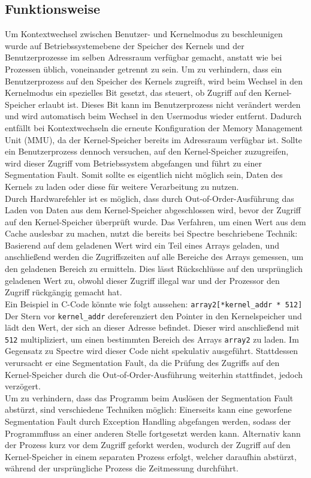 \subsection{Funktionsweise}
\label{subsec:meltdown_funktionsweise}
Um Kontextwechsel zwischen Benutzer- und Kernelmodus zu beschleunigen wurde auf Betriebssystemebene der Speicher des Kernels und der Benutzerprozesse im selben Adressraum verfügbar gemacht, anstatt wie bei Prozessen üblich, voneinander getrennt zu sein.
Um zu verhindern, dass ein Benutzerprozess auf den Speicher des Kernels zugreift, wird beim Wechsel in den Kernelmodus ein spezielles Bit gesetzt, das steuert, ob Zugriff auf den Kernel-Speicher erlaubt ist.
Dieses Bit kann im Benutzerprozess nicht verändert werden und wird automatisch beim Wechsel in den Usermodus wieder entfernt.
Dadurch entfällt bei Kontextwechseln die erneute Konfiguration der Memory Management Unit (MMU), da der Kernel-Speicher bereits im Adressraum verfügbar ist.
Sollte ein Benutzerprozess dennoch versuchen, auf den Kernel-Speicher zuzugreifen, wird dieser Zugriff vom Betriebssystem abgefangen und führt zu einer Segmentation Fault.
Somit sollte es eigentlich nicht möglich sein, Daten des Kernels zu laden oder diese für weitere Verarbeitung zu nutzen. \\
Durch Hardwarefehler ist es möglich, dass durch Out-of-Order-Ausführung das Laden von Daten aus dem Kernel-Speicher abgeschlossen wird, bevor der Zugriff auf den Kernel-Speicher überprüft wurde.
Das Verfahren, um einen Wert aus dem Cache auslesbar zu machen, nutzt die bereits bei Spectre beschriebene Technik: Basierend auf dem geladenen Wert wird ein Teil eines Arrays geladen, und anschließend werden die Zugriffszeiten auf alle Bereiche des Arrays gemessen, um den geladenen Bereich zu ermitteln.
Dies lässt Rückschlüsse auf den ursprünglich geladenen Wert zu, obwohl dieser Zugriff illegal war und der Prozessor den Zugriff rückgängig gemacht hat. \\
Ein Beispiel in C-Code könnte wie folgt aussehen:
\texttt{array2[*kernel\_addr * 512]}\\
Der Stern vor \texttt{kernel\_addr} dereferenziert den Pointer in den Kernelspeicher und lädt den Wert, der sich an dieser Adresse befindet.
Dieser wird anschließend mit \texttt{512} multipliziert, um einen bestimmten Bereich des Arrays \texttt{array2} zu laden.
Im Gegensatz zu Spectre wird dieser Code nicht spekulativ ausgeführt.
Stattdessen verursacht er eine Segmentation Fault, da die Prüfung des Zugriffs auf den Kernel-Speicher durch die Out-of-Order-Ausführung weiterhin stattfindet, jedoch verzögert.\\
Um zu verhindern, dass das Programm beim Auslösen der Segmentation Fault abstürzt, sind verschiedene Techniken möglich:
Einerseits kann eine geworfene Segmentation Fault durch Exception Handling abgefangen werden, sodass der Programmfluss an einer anderen Stelle fortgesetzt werden kann.
Alternativ kann der Prozess kurz vor dem Zugriff geforkt werden, wodurch der Zugriff auf den Kernel-Speicher in einem separaten Prozess erfolgt, welcher daraufhin abstürzt, während der ursprüngliche Prozess die Zeitmessung durchführt.
